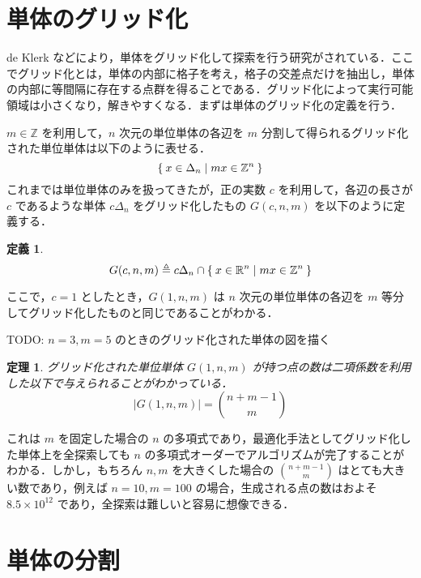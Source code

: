 \documentclass[a4paper,11pt]{jreport}
\newtheorem{definition}{定義}
\newtheorem{theorem}{定理}
\begin{document}
\section{単体のグリッド化}

de Klerk \cite{deklerk} などにより，単体をグリッド化して探索を行う研究がされている．ここでグリッド化とは，単体の内部に格子を考え，格子の交差点だけを抽出し，単体の内部に等間隔に存在する点群を得ることである．グリッド化によって実行可能領域は小さくなり，解きやすくなる．まずは単体のグリッド化の定義を行う．\par
$ m \in \mathbb{Z} $ を利用して，$ n $ 次元の単位単体の各辺を $ m $ 分割して得られるグリッド化された単位単体は以下のように表せる．
$$ \Set{ x \in \Delta_n | mx \in \mathbb{Z}^n } $$
これまでは単位単体のみを扱ってきたが，正の実数 $ c $ を利用して，各辺の長さが $ c $ であるような単体 $ c \Delta_n $ をグリッド化したもの $ G(c, n, m) $ を以下のように定義する．\par
\begin{definition}
$$ G(c, n, m) \triangleq c \Delta_n \cap \Set{x \in \mathbb{R}^n | mx \in \mathbb{Z}^n} $$
\end{definition}
ここで，$ c = 1 $ としたとき，$ G(1, n, m) $ は $ n $ 次元の単位単体の各辺を $ m $ 等分してグリッド化したものと同じであることがわかる．\par
TODO: $ n = 3, m = 5 $ のときのグリッド化された単体の図を描く\par

\begin{theorem} \label{n_grid}
グリッド化された単位単体 $ G(1, n, m) $ が持つ点の数は二項係数を利用した以下で与えられることがわかっている．
$$ | G(1, n, m) | = \binom{n + m - 1}{m} $$
\end{theorem}

これは $ m $ を固定した場合の $ n $ の多項式であり，最適化手法としてグリッド化した単体上を全探索しても $ n $ の多項式オーダーでアルゴリズムが完了することがわかる．しかし，もちろん $ n, m $ を大きくした場合の $ \binom{n + m - 1}{m} $ はとても大きい数であり，例えば $ n = 10, m = 100 $ の場合，生成される点の数はおよそ $ 8.5 \times 10^{12} $ であり，全探索は難しいと容易に想像できる．\par

\section{単体の分割} \label{partition}
\end{document}
